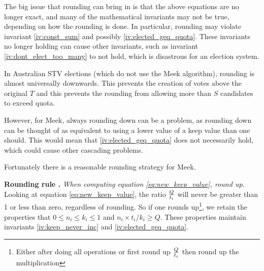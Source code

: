 \documentclass{article}
\begin{document}
The big issue that rounding can bring in is that the above equations are no longer
exact, and many of the mathematical invariants may not be true, depending on how
the rounding is done. In particular, rounding may violate invariant \ref{iv:const_sum}
and possibly \ref{iv:elected_geq_quota}. These invariants no longer holding can
cause other invariants, such as invariant \ref{iv:dont_elect_too_many} to not hold, 
which is disastrous for an election system.

In Australian STV elections (which do not use the Meek algorithm), rounding is almost
universally downwards. This prevents the creation of votes above the original
$T$ and this prevents the rounding from allowing more than $S$ candidates to
exceed quota.

However, for Meek, always rounding down can be a problem, as rounding down can be 
thought of as equivalent to using a lower value of a keep value than 
one should. This would mean that \ref{iv:elected_geq_quota} does not necessarily
hold, which could cause other cascading problems.

Fortunately there is a reasonable rounding strategy for Meek.

\newenvironment{roundingrule}[1][]{\refstepcounter{roundingrule}\par\medskip
   \noindent\textbf{Rounding rule \theroundingrule. #1} \rmfamily}{\medskip}

\begin{roundingrule} \label{rr:keep}
    \emph{When computing equation \ref{eq:new_keep_value}, round up.}
    Looking at equation \ref{eq:new_keep_value}, the ratio ${Q\over t_i}$ will never
be greater than 1 or less than zero, regardless of rounding. 
So if one rounds up\footnote{Either after doing all operations or first round up ${Q\over t_i}$ then round up the multiplication},
we retain the properties that $0\leq n_i \leq k_i \leq 1$ and $n_i \times {t_i/k_i} \geq Q$.
These properties maintain invariants \ref{iv:keep_never_inc} and \ref{iv:elected_geq_quota}.
\end{roundingrule}
\end{document}
